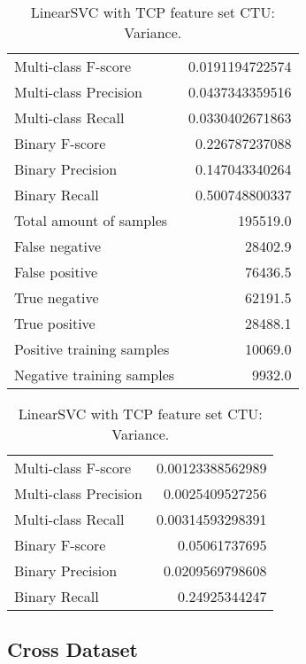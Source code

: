 \begin{table}[H]
\begin{minipage}{0.5\textwidth}
\caption{LinearSVC with TCP feature set CTU: Average.}
\centering
\begin{tabular}{l r}
\toprule
Multi-class F-score & 0.0191194722574 \\
Multi-class Precision & 0.0437343359516 \\
Multi-class Recall & 0.0330402671863 \\
\midrule
Binary F-score & 0.226787237088 \\
Binary Precision & 0.147043340264 \\
Binary Recall & 0.500748800337 \\
\midrule
Total amount of samples & 195519.0 \\
False negative & 28402.9 \\
False positive & 76436.5 \\
True negative & 62191.5 \\
True positive & 28488.1 \\
\midrule
Positive training samples & 10069.0 \\
Negative training samples & 9932.0 \\
\bottomrule
\end{tabular}
\end{minipage}
\hfillx
\begin{minipage}{0.5\textwidth}
\caption{LinearSVC with TCP feature set CTU: Variance.}
\centering
\begin{tabular}{l r}
\toprule
Multi-class F-score & 0.00123388562989 \\
Multi-class Precision & 0.0025409527256 \\
Multi-class Recall & 0.00314593298391 \\
\midrule
Binary F-score & 0.05061737695 \\
Binary Precision & 0.0209569798608 \\
Binary Recall & 0.24925344247 \\
\bottomrule
\end{tabular}
\end{minipage}
\end{table}

\newpage
\subsection{Cross Dataset}

